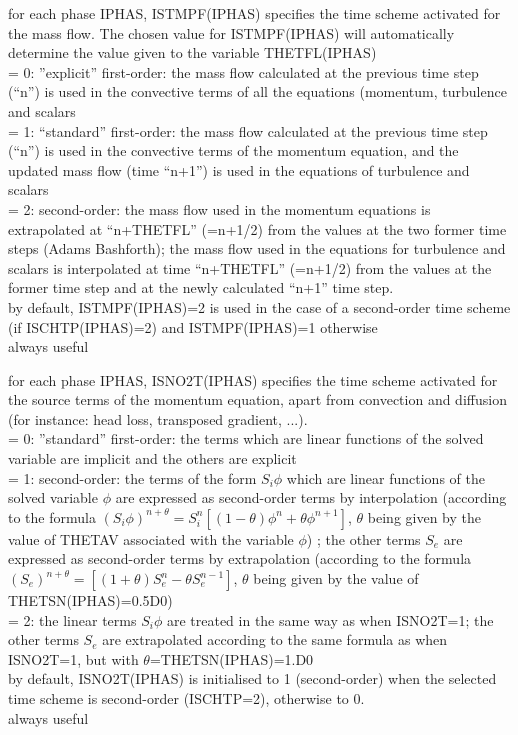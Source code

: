 {for each phase IPHAS, ISTMPF(IPHAS) specifies the time scheme activated
for the mass flow. The chosen value for ISTMPF(IPHAS) will automatically
determine the value given to the variable THETFL(IPHAS)\\
\hspace*{1.3cm}= 0: ''explicit'' first-order: the mass flow calculated
at the previous time step (``n'') is used in the convective terms of all
the equations (momentum, turbulence and scalars\\
\hspace*{1.3cm}= 1: ``standard'' first-order: the mass flow calculated
at the previous time step (``n'') is used in the convective terms of the
momentum equation, and the updated mass flow (time ``n+1'') is used in the
equations of turbulence and scalars\\
\hspace*{1.3cm}= 2: second-order: the mass flow used in the momentum equations
is extrapolated at ``n+THETFL'' (=n+1/2) from the values at the two former time
steps (Adams Bashforth); the mass flow used in the equations for turbulence and
scalars is interpolated at time ``n+THETFL'' (=n+1/2) from the values at the
former time step and at the newly calculated ``n+1'' time step.\\
by default, ISTMPF(IPHAS)=2 is used in the case of a second-order time
scheme (if ISCHTP(IPHAS)=2) and ISTMPF(IPHAS)=1 otherwise\\
always useful}

{for each phase IPHAS, ISNO2T(IPHAS) specifies the time scheme activated
for the source terms of the momentum equation, apart from convection and
diffusion (for instance: head loss, transposed gradient, ...).\\
\hspace*{1.3cm}= 0: ''standard'' first-order: the terms which are linear
functions of the solved variable are implicit and the others are explicit\\
\hspace*{1.3cm}= 1: second-order: the terms of the form $S_i\phi$ which are
linear functions of the solved variable
$\phi$ are expressed as second-order terms by interpolation (according
to the formula
$(S_i\phi)^{n+\theta}=S_i^n[(1-\theta)\phi^n+\theta\phi^{n+1}]$, $\theta$
being given by the value of THETAV associated with the variable $\phi$)
; the other terms $S_e$ are expressed as second-order terms by
extrapolation (according to the formula
$(S_e)^{n+\theta}=[(1+\theta)S_e^n-\theta S_e^{n-1}]$, $\theta$ being
given by the value of THETSN(IPHAS)=0.5D0)\\
\hspace*{1.3cm}= 2: the linear terms $S_i\phi$ are treated in the same
way as when ISNO2T=1;
the other terms $S_e$ are extrapolated according to the same formula
as when ISNO2T=1, but with $\theta$=THETSN(IPHAS)=1.D0\\
by default, ISNO2T(IPHAS) is initialised to 1 (second-order) when the selected
time scheme is second-order (ISCHTP=2), otherwise to 0.\\
always useful}

